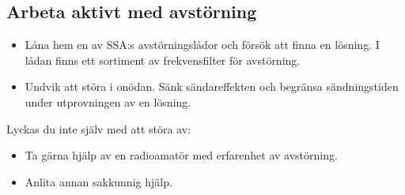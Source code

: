 \subsection{Arbeta aktivt med avstörning}

\begin{itemize}
	\item Låna hem en av SSA:s avstörningslådor och försök att finna en lösning.
	I lådan finns ett sortiment av frekvensfilter för avstörning.
	\item Undvik att störa i onödan.
	Sänk sändareffekten och begränsa sändningstiden under utprovningen av en
	lösning.
\end{itemize}

Lyckas du inte själv med att störa av:
\begin{itemize}
	\item Ta gärna hjälp av en radioamatör med erfarenhet av avstörning.
	\item Anlita annan sakkunnig hjälp.
\end{itemize}
